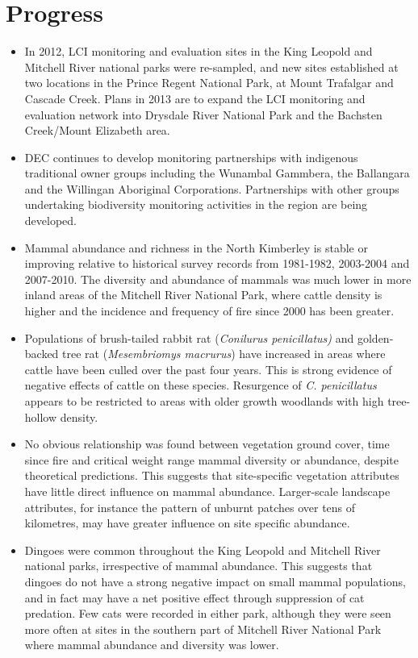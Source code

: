 \documentclass[version=last, paper=a4, DIV=18, usenames, dvipsnames]{scrartcl}
\begin{document}
\section{Progress}



\begin{itemize}

  \item In 2012, LCI monitoring and evaluation sites in the King Leopold and Mitchell River national parks were re-sampled, and new sites established at two locations in the Prince Regent National Park, at Mount Trafalgar and Cascade Creek. Plans in 2013 are to expand the LCI monitoring and evaluation network into Drysdale River National Park and the Bachsten Creek/Mount Elizabeth area.

  \item DEC continues to develop monitoring partnerships with indigenous traditional owner groups including the Wunambal Gammbera, the Ballangara and the Willingan Aboriginal Corporations. Partnerships with other groups undertaking biodiversity monitoring activities in the region are being developed.

  \item Mammal abundance and richness in the North Kimberley is stable or improving relative to historical survey records from 1981-1982, 2003-2004 and 2007-2010. The diversity and abundance of mammals was much lower in more inland areas of the Mitchell River National Park, where cattle density is higher and the incidence and frequency of fire since 2000 has been greater.

  \item Populations of brush-tailed rabbit rat (\emph{Conilurus penicillatus)} and golden-backed tree rat (\emph{Mesembriomys macrurus}) have increased in areas where cattle have been culled over the past four years. This is strong evidence of negative effects of cattle on these species. Resurgence of \emph{C. penicillatus} appears to be restricted to areas with older growth woodlands with high tree-hollow density.

  \item No obvious relationship was found between vegetation ground cover, time since fire and critical weight range mammal diversity or abundance, despite theoretical predictions. This suggests that site-specific vegetation attributes have little direct influence on mammal abundance. Larger-scale landscape attributes, for instance the pattern of unburnt patches over tens of kilometres, may have greater influence on site specific abundance.

  \item Dingoes were common throughout the King Leopold and Mitchell River national parks, irrespective of mammal abundance. This suggests that dingoes do not have a strong negative impact on small mammal populations, and in fact may have a net positive effect through suppression of cat predation. Few cats were recorded in either park, although they were seen more often at sites in the southern part of Mitchell River National Park where mammal abundance and diversity was lower.

\end{itemize}
\end{document}
